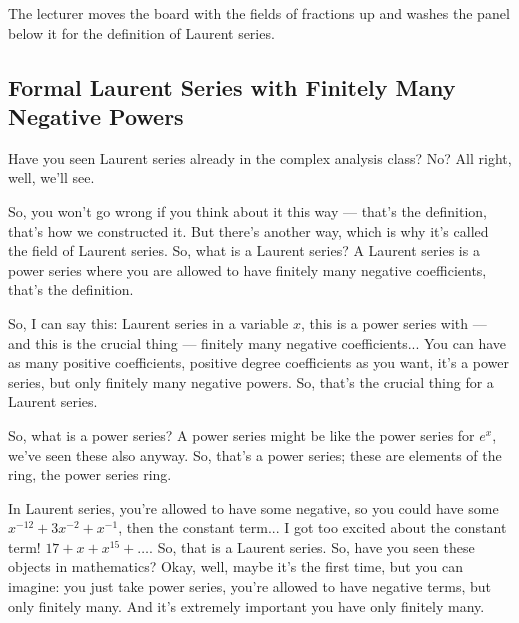\begin{note}
The lecturer moves the board with the fields of fractions up and washes the panel below it for the definition of Laurent series.
\end{note}

\subsection{Formal Laurent Series with Finitely Many Negative Powers}

\begin{speech}[00:10:48 - 00:12:45]
Have you seen Laurent series already in the complex analysis class? No? All right, well, we'll see. 

So, you won't go wrong if you think about it this way --- that's the definition, that's how we constructed it. But there's another way, which is why it's called the field of Laurent series. So, what is a Laurent series? A Laurent series is a power series where you are allowed to have finitely many negative coefficients, that's the definition. 

So, I can say this:  Laurent series in a variable $x$, this is a power series with --- and this is the crucial thing ---  finitely many negative coefficients...  You can have as many positive coefficients, positive degree coefficients as you want, it's a power series, but only finitely many negative powers. So, that's the crucial thing for a Laurent series. 

So, what is a power series? A power series might be like the power series for $e^x$,  we've seen these also anyway. So, that's a power series; these are elements of the ring, the power series ring. 

In Laurent series, you're allowed to have some negative, so you could have some $x^{-12} + 3 x^{-2} + x^{-1}$, then the constant term... I got too excited about the constant term! $17 + x + x^{15} + \dots$.  So, that is a Laurent series. So, have you seen these objects in mathematics? Okay, well, maybe it's the first time, but you can imagine: you just take power series, you're allowed to have negative terms, but only finitely many. And it's extremely important you have only finitely many.
\end{speech}

